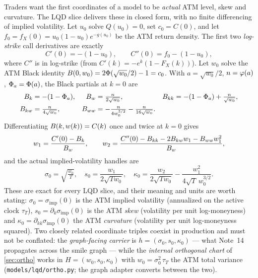 \documentclass[11pt]{article}
\begin{document}
Traders want the first coordinates of a model to be \emph{actual} ATM level,
skew and curvature. The LQD slice delivers these in closed form, with no finite
differencing of implied volatility. Let $u_0$ solve $Q(u_0)=0$, set
$c_0=C(0)$, and let $f_0=f_X(0)=u_0(1-u_0)e^{-g(u_0)}$ be the ATM return density.
The first two \emph{log-strike} call derivatives are exactly
\begin{equation}
C'(0)=-(1-u_0),\qquad C''(0)=f_0-(1-u_0),
\label{eq:Cder}
\end{equation}
where $C''$ is in log-strike (from $C'(k)=-e^{k}(1-F_X(k))$). Let $w_0$ solve the
ATM Black identity $B(0,w_0)=2\Phi(\sqrt{w_0}/2)-1=c_0$. With $a=\sqrt{w_0}/2$,
$n=\varphi(a)$, $\Phi_a=\Phi(a)$, the Black partials at $k=0$ are
\begin{equation}
\begin{aligned}
B_k&=-(1-\Phi_a), &
B_w&=\tfrac{n}{2\sqrt{w_0}}, &
B_{kk}&=-(1-\Phi_a)+\tfrac{n}{\sqrt{w_0}},\\
B_{kw}&=\tfrac{n}{4\sqrt{w_0}}, &
B_{ww}&=-\tfrac{n}{4w_0^{3/2}}-\tfrac{n}{16\sqrt{w_0}}. & &
\end{aligned}
\end{equation}
Differentiating $B(k,w(k))=C(k)$ once and twice at $k=0$ gives
\begin{equation}
w_1=\frac{C'(0)-B_k}{B_w},
\qquad
w_2=\frac{C''(0)-B_{kk}-2B_{kw}w_1-B_{ww}w_1^2}{B_w},
\end{equation}
and the actual implied-volatility handles are
\begin{equation}
\sigma_0=\sqrt{\tfrac{w_0}{T}},\quad
s_0=\frac{w_1}{2\sqrt{Tw_0}},\quad
\kappa_0=\frac{w_2}{2\sqrt{Tw_0}}-\frac{w_1^2}{4\sqrt{T}\,w_0^{3/2}}.
\label{eq:atm_handles}
\end{equation}
These are exact for every LQD slice, and their meaning and units are worth
stating: $\sigma_0=\sigma_{\text{imp}}(0)$ is the ATM implied volatility
(annualized on the active clock $\tau_T$),
$s_0=\partial_k\sigma_{\text{imp}}(0)$ is the ATM \emph{skew} (volatility per
unit log-moneyness) and $\kappa_0=\partial_{kk}\sigma_{\text{imp}}(0)$ the ATM
\emph{curvature} (volatility per unit log-moneyness squared). Two closely
related coordinate triples coexist in production and must not be conflated:
the \emph{graph-facing carrier} is $h=(\sigma_0,s_0,\kappa_0)$ --- what
Note~14 propagates across the smile graph --- while the \emph{internal
orthogonal chart} of \cref{sec:ortho} works in $H=(w_0,s_0,\kappa_0)$ with
$w_0=\sigma_0^2\,\tau_T$ the ATM total variance (\texttt{models/lqd/ortho.py};
the graph adapter converts between the two).
\end{document}
